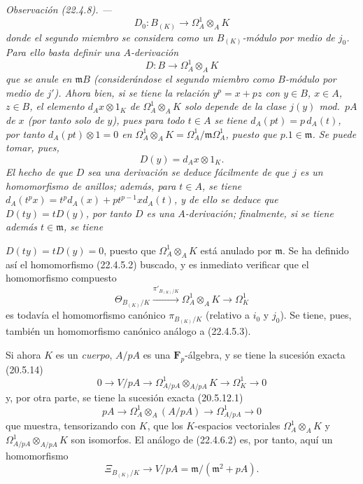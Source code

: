 \documentclass[10pt,oneside]{book}
\makeatletter
\newcommand{\setmanualcurrentlabel}[1]{\def\@currentlabel{#1}}
\newcommand{\oldpage}[2][]{%
  \setcounter{footnote}{0}%
  \marginpar{\scriptsize\textbf{#1}~|~#2}\ignorespaces}
\newenvironment{remark}[1][]{%
  \setmanualcurrentlabel{#1}\par\medskip\noindent\itshape Observación (#1). ---\ }{\par}
\makeatother
\begin{document}
\begin{remark}[22.4.8]
\begin{equation}
  D_0:B_{(K)}\longrightarrow\Omega^1_A\otimes_AK
  \tag{22.4.8.2}
\end{equation}
donde el segundo miembro se considera como un $B_{(K)}$-módulo por medio de $j_0$.
Para ello basta definir una $A$-\emph{derivación}
\begin{equation}
\label{0.22.4.8.3-es}
  D:B\longrightarrow\Omega^1_A\otimes_AK
  \tag{22.4.8.3}
\end{equation}
que \emph{se anule en} $\mathfrak mB$ (considerándose el segundo miembro como
$B$-módulo por medio de $j'$). Ahora bien, si se tiene la relación $y^p=x+pz$ con
$y\in B$, $x\in A$, $z\in B$, el elemento $d_Ax\otimes1_K$ de
$\Omega^1_A\otimes_AK$ solo depende de la \emph{clase} $j(y)$ mod.~$pA$ de $x$
(por tanto solo de $y$), pues para todo $t\in A$ se tiene
$d_A(pt)=p\,d_A(t)$, por tanto $d_A(pt)\otimes1=0$ en
$\Omega^1_A\otimes_AK=\Omega^1_A/\mathfrak m\Omega^1_A$, puesto que
$p.1\in\mathfrak m$. Se puede tomar, pues,
\[
  D(y)=d_Ax\otimes1_K.
\]
El hecho de que $D$ sea una derivación se deduce fácilmente de que $j$ es un
homomorfismo de anillos; además, para $t\in A$, se tiene
$d_A(t^px)=t^p d_A(x)+pt^{p-1}x d_A(t)$, y de ello se deduce que
$D(ty)=tD(y)$, por tanto $D$ es una $A$-derivación; finalmente, si se tiene además
$t\in\mathfrak m$, se tiene

\oldpage[0\textsubscript{IV-1}]{201}

$D(ty)=tD(y)=0$, puesto que $\Omega^1_A\otimes_AK$ está anulado por $\mathfrak m$.
Se ha definido así el homomorfismo (22.4.5.2) buscado, y es inmediato
verificar que el homomorfismo compuesto
\[
  \Theta_{B_{(K)}/K}\xrightarrow{\pi'_{B_{(K)}/K}}
  \Omega^1_A\otimes_AK\longrightarrow\Omega^1_K
\]
es todavía el homomorfismo canónico $\pi_{B_{(K)}/K}$ (relativo a $i_0$ y
$j_0$). Se tiene, pues, también un homomorfismo canónico análogo a (22.4.5.3).

Si ahora $K$ es un \emph{cuerpo}, $A/pA$ es una $\mathbf F_p$-álgebra,
y se tiene la sucesión exacta (20.5.14)
\[
  0\longrightarrow V/pA\longrightarrow
  \Omega^1_{A/pA}\otimes_{A/pA}K\longrightarrow\Omega^1_K\longrightarrow0
\]
y, por otra parte, se tiene la sucesión exacta (20.5.12.1)
\[
  pA\longrightarrow\Omega^1_A\otimes_A(A/pA)
  \longrightarrow\Omega^1_{A/pA}\longrightarrow0
\]
que muestra, tensorizando con $K$, que los $K$-espacios vectoriales
$\Omega^1_A\otimes_AK$ y
$\Omega^1_{A/pA}\otimes_{A/pA}K$ son isomorfos. El análogo de (22.4.6.2) es,
por tanto, aquí un homomorfismo
\begin{equation}
\label{0.22.4.8.4-es}
  \Xi_{B_{(K)}/K}\longrightarrow V/pA=\mathfrak m/(\mathfrak m^2+pA).
  \tag{22.4.8.4}
\end{equation}


\end{remark}
\end{document}
